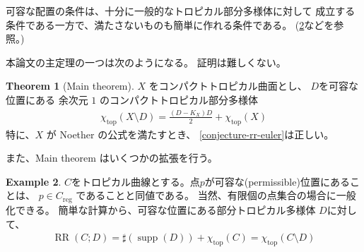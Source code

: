 \documentclass[a4paper,dvipdfmx,reqno,12pt]{amsart}
\theoremstyle{definition}
\newtheorem{theorem}{Theorem}[section]
\newtheorem{example}[theorem]{Example}
\newcommand{\opn}[1]{\operatorname{#1}}
\numberwithin{equation}{section}
\begin{document}
可容な配置の条件は、十分に一般的なトロピカル部分多様体に対して
成立する条件である一方で、満たさないものも簡単に作れる条件である。
(\cref{example-permissible-point}などを参照。)

本論文の主定理の一つは次のようになる。
証明は難しくない。
\begin{theorem}[{Main theorem}]
\label{theorem-rr-euler-surface}
$X$ をコンパクトトロピカル曲面とし、
$D$を可容な位置にある
余次元 $1$ のコンパクトトロピカル部分多様体
\begin{align}
\chi_{\opn{top}}(X\setminus D)=\frac{(D-K_X)D}{2}+
\chi_{\opn{top}}(X)
\end{align}
特に、$X$ が Noether の公式を満たすとき、
\cref{conjecture-rr-euler}は正しい。
\end{theorem}

また、Main theorem はいくつかの拡張を行う。

\begin{example}
\label{example-permissible-point}
$C$をトロピカル曲線とする。点$p$が可容な(permissible)位置にあることは、
$p\in C_{\opn{reg}}$ であることと同値である。
当然、有限個の点集合の場合に一般化できる。
簡単な計算から、可容な位置にある部分トロピカル多様体
$D$に対して、
\begin{align}
\opn{RR}(C;D)=\sharp (\opn{supp}(D))+ \chi_{\opn{top}}(C)
=\chi_{\opn{top}}(C\setminus D)
\end{align}

\end{example}
\end{document}

